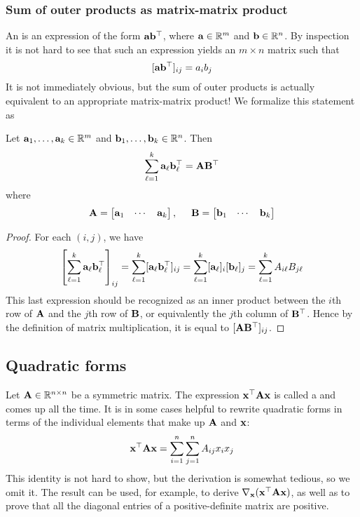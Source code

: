 \subsubsection{Sum of outer products as matrix-matrix product}
An  is an expression of the form $\mathbf{a}\mathbf{b}^\top$, where $\mathbf{a} \in \mathbb{R}^m$ and $\mathbf{b} \in \mathbb{R}^n$.
By inspection it is not hard to see that such an expression yields an $m \times n$ matrix such that
\[[\mathbf{a}\mathbf{b}^\top]_{ij} = a_ib_j\]
It is not immediately obvious, but the sum of outer products is actually equivalent to an appropriate matrix-matrix product!
We formalize this statement as
\begin{proposition}
Let $\mathbf{a}_1, \dots, \mathbf{a}_k \in \mathbb{R}^m$ and $\mathbf{b}_1, \dots, \mathbf{b}_k \in \mathbb{R}^n$. Then
\[\sum_{\ell=1}^k \mathbf{a}_\ell\mathbf{b}_\ell^\top = \mathbf{A}\mathbf{B}^\top\]
where
\[\mathbf{A} = \begin{bmatrix}\mathbf{a}_1 & \cdots & \mathbf{a}_k\end{bmatrix}, \hspace{0.5cm} \mathbf{B} = \begin{bmatrix}\mathbf{b}_1 & \cdots & \mathbf{b}_k\end{bmatrix}\]
\end{proposition}
\begin{proof}
For each $(i,j)$, we have
\[\left[\sum_{\ell=1}^k \mathbf{a}_\ell\mathbf{b}_\ell^\top\right]_{ij} = \sum_{\ell=1}^k [\mathbf{a}_\ell\mathbf{b}_\ell^\top]_{ij} = \sum_{\ell=1}^k [\mathbf{a}_\ell]_i[\mathbf{b}_\ell]_j = \sum_{\ell=1}^k A_{i\ell}B_{j\ell}\]
This last expression should be recognized as an inner product between the $i$th row of $\mathbf{A}$ and the $j$th row of $\mathbf{B}$, or equivalently the $j$th column of $\mathbf{B}^\top$.
Hence by the definition of matrix multiplication, it is equal to $[\mathbf{A}\mathbf{B}^\top]_{ij}$.
\end{proof}

\subsection{Quadratic forms}
Let $\mathbf{A} \in \mathbb{R}^{n \times n}$ be a symmetric matrix.
The expression $\mathbf{x}^\top\mathbf{A}\mathbf{x}$ is called a  and comes up all the time.
It is in some cases helpful to rewrite quadratic forms in terms of the individual elements that make up $\mathbf{A}$ and $\mathbf{x}$:
\[\mathbf{x}^\top\mathbf{A}\mathbf{x} = \sum_{i=1}^n\sum_{j=1}^n A_{ij}x_ix_j\]
This identity is not hard to show, but the derivation is somewhat tedious, so we omit it.
The result can be used, for example, to derive $\nabla_{\mathbf{x}}(\mathbf{x}^\top\mathbf{A}\mathbf{x})$, as well as to prove that all the diagonal entries of a positive-definite matrix are positive.

